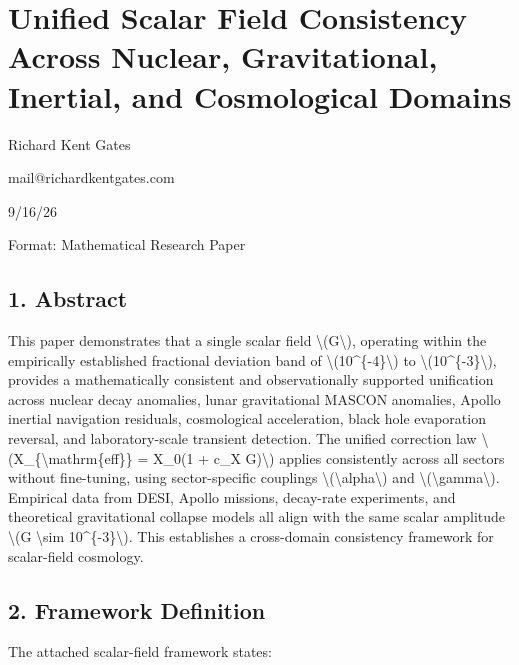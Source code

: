 \documentclass[
  10pt,
]{article}
\author{}
\date{}
\begin{document}
\hypertarget{unified-scalar-field-consistency-across-nuclear-gravitational-inertial-and-cosmological-domains}{%
\section{Unified Scalar Field Consistency Across Nuclear, Gravitational,
Inertial, and Cosmological
Domains}\label{unified-scalar-field-consistency-across-nuclear-gravitational-inertial-and-cosmological-domains}}

Richard Kent Gates

mail@richardkentgates.com

9/16/26

Format: Mathematical Research Paper

\hypertarget{abstract}{%
\subsection{1. Abstract}\label{abstract}}

This paper demonstrates that a single scalar field
\textbackslash(G\textbackslash), operating within the empirically
established fractional deviation band of
\textbackslash(10\^{}\{-4\}\textbackslash) to
\textbackslash(10\^{}\{-3\}\textbackslash), provides a mathematically
consistent and observationally supported unification across nuclear
decay anomalies, lunar gravitational MASCON anomalies, Apollo inertial
navigation residuals, cosmological acceleration, black hole evaporation
reversal, and laboratory-scale transient detection. The unified
correction law \textbackslash(X\_\{\textbackslash mathrm\{eff\}\} =
X\_0(1 + c\_X G)\textbackslash) applies consistently across all sectors
without fine-tuning, using sector-specific couplings
\textbackslash(\textbackslash alpha\textbackslash) and
\textbackslash(\textbackslash gamma\textbackslash). Empirical data from
DESI, Apollo missions, decay-rate experiments, and theoretical
gravitational collapse models all align with the same scalar amplitude
\textbackslash(G \textbackslash sim 10\^{}\{-3\}\textbackslash). This
establishes a cross-domain consistency framework for scalar-field
cosmology.

\hypertarget{framework-definition}{%
\subsection{2. Framework Definition}\label{framework-definition}}

The attached scalar-field framework states:
\end{document}
